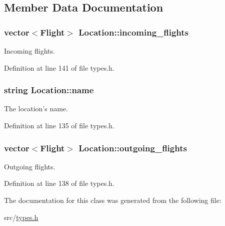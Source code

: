 \subsection{Member Data Documentation}
\hypertarget{class_location_ac43a0eca7e83b95962344c04b43494ab}{
\subsubsection[{incoming\-\_\-flights}]{\setlength{\rightskip}{0pt plus 5cm}vector$<${\bf Flight}$>$ Location\-::incoming\-\_\-flights}}\label{class_location_ac43a0eca7e83b95962344c04b43494ab}


Incoming flights. 



Definition at line 141 of file types.\-h.

\hypertarget{class_location_a0ae46c7127ec349e484ed075c91ba258}{
\subsubsection[{name}]{\setlength{\rightskip}{0pt plus 5cm}string Location\-::name}}\label{class_location_a0ae46c7127ec349e484ed075c91ba258}


The location's name. 



Definition at line 135 of file types.\-h.

\hypertarget{class_location_ace927068b1af49e5519844c15668e789}{
\subsubsection[{outgoing\-\_\-flights}]{\setlength{\rightskip}{0pt plus 5cm}vector$<${\bf Flight}$>$ Location\-::outgoing\-\_\-flights}}\label{class_location_ace927068b1af49e5519844c15668e789}


Outgoing flights. 



Definition at line 138 of file types.\-h.



The documentation for this class was generated from the following file\-:\begin{DoxyCompactItemize}
\item 
src/\hyperlink{types_8h}{types.\-h}\end{DoxyCompactItemize}
